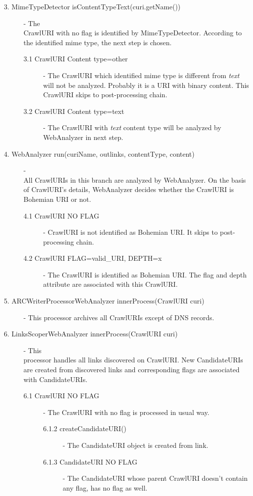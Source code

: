 \documentclass[11pt,a4paper]{article}
\begin{document}
\begin{description}
\item[3. MimeTypeDetector isContentTypeText(curi.getName())] - The \\CrawlURI with no flag is identified by MimeTypeDetector. According to the identified mime type, the next step is chosen.

\begin{description}
\item[3.1 CrawlURI Content type=other] - The CrawlURI which identified mime type is different from \emph{text} will not be analyzed. Pro\-bab\-ly it is a URI with binary content. This CrawlURI skips to post-processing chain.
\item[3.2 CrawlURI Content type=text] - The CrawlURI with \emph{text} content type will be analyzed by WebAnalyzer in next step.
\end{description}

\item[4. WebAnalyzer run(curiName, outlinks, contentType, content)] - \\All CrawlURIs in this branch are analyzed by WebAnalyzer. On the basis of CrawlURI's details, WebAnalyzer decides whether the CrawlURI is Bohemian URI or not.

\begin{description}
\item[4.1 CrawlURI NO FLAG] - CrawlURI is not identified as Bohemian URI. It skips to post-processing chain.
\item[4.2 CrawlURI FLAG=valid\_URI, DEPTH=x] - The CrawlURI is identified as Bohemian URI. The flag and depth attribute are associated with this CrawlURI.
\end{description}

\item[5. ARCWriterProcessorWebAnalyzer innerProcess(CrawlURI curi)] - This processor archives all CrawlURIs except of DNS records.
\item[6. LinksScoperWebAnalyzer innerProcess(CrawlURI curi)] - This \\processor handles all links discovered on CrawlURI. New CandidateURIs are created from discovered links and corresponding flags are associated with CandidateURIs.

\begin{description}
\item[6.1 CrawlURI NO FLAG] - The CrawlURI with no flag is processed in usual way.

\begin{description}
\item[6.1.2 createCandidateURI()] - The CandidateURI object is created from link.
\item[6.1.3 CandidateURI NO FLAG] - The CandidateURI whose parent CrawlURI doesn't contain any flag, has no flag as well.
\end{description}


\end{description}
\end{description}
\end{document}
